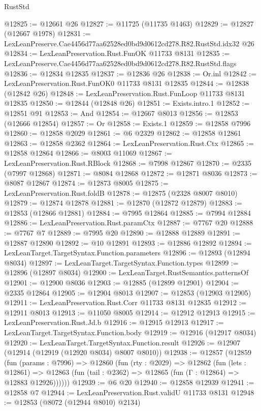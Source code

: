 \begin{lexlean}{RustStd}
\begin{coremodule}
@12825 := @12661 @26
@12827 := @11725 (@11735 @1463)
@12829 := @12827 (@12667 @1978)
@12831 := LexLeanPreserve.Cae4456d77aa62528ed0bd9d0612cd278.R82.RustStd.idx32 @26
@12834 := LexLeanPreservation.Rust.FunOK @11733 @8131
@12835 := LexLeanPreserve.Cae4456d77aa62528ed0bd9d0612cd278.R82.RustStd.flags
@12836 := @12834 @12835
@12837 := @12836 @26
@12838 := Or.inl
@12842 := LexLeanPreservation.Rust.FunOK0 @11733 @8131 @12835
@12844 := @12838 (@12842 @26)
@12848 := LexLeanPreservation.Rust.FunLoop @11733 @8131 @12835
@12850 := @12844 (@12848 @26)
@12851 := Exists.intro.{1}
@12852 := @12851 @91
@12853 := And
@12854 := @12667 @8013
@12856 := @12853 (@12666 @12854)
@12857 := Or
@12858 := Exists.{1}
@12859 := @12858 @7996
@12860 := @12858 @2029
@12861 := @6 @2329
@12862 := @12858 @12861
@12863 := @12858 @2362
@12864 := LexLeanPreservation.Rust.Ctx
@12865 := @12858 @12864
@12866 := @8003 @11069
@12867 := LexLeanPreservation.Rust.RBlock
@12868 := @7998 @12867
@12870 := @2335 (@7997 @12868)
@12871 := @8084 @12868
@12872 := @12871 @8036
@12873 := @8087 @12867
@12874 := @12873 @8005
@12875 := LexLeanPreservation.Rust.foldB
@12878 := @12875 (@2328 @8007 @8010)
@12879 := @12874 @12878
@12881 := @12870 (@12872 @12879)
@12883 := @12853 (@12866 @12881)
@12884 := @7995 @12864
@12885 := @7994 @12884
@12886 := LexLeanPreservation.Rust.paramCtx
@12887 := @7767 @20
@12888 := @7767 @7
@12889 := @7995 @20
@12890 := @12888 @12889
@12891 := @12887 @12890
@12892 := @10 @12891
@12893 := @12886 @12892
@12894 := LexLeanTarget.TargetSyntax.Function.parameters
@12896 := @12893 (@12894 @8034)
@12897 := LexLeanTarget.TargetSyntax.Function.types
@12899 := @12896 (@12897 @8034)
@12900 := LexLeanTarget.RustSemantics.patternsOf
@12901 := @12900 @8036
@12903 := @12885 (@12899 @12901)
@12904 := @2335 @12864
@12905 := @12904 @8013
@12907 := @12853 (@12903 @12905)
@12911 := LexLeanPreservation.Rust.Corr @11733 @8131 @12835
@12912 := @12911 @8013
@12913 := @11050 @8005
@12914 := @12912 @12913
@12915 := LexLeanPreservation.Rust.Jd.b
@12916 := @12915 @12913
@12917 := LexLeanTarget.TargetSyntax.Function.body
@12919 := @12916 (@12917 @8034)
@12920 := LexLeanTarget.TargetSyntax.Function.result
@12926 := @12907 (@12914 (@12919 (@12920 @8034) @8007 @8010))
@12938 := @12857
    (@12859
      (fun (params : @7996) =>
      @12860
        (fun (rty : @2029) =>
        @12862
          (fun (lets : @12861) =>
          @12863 (fun (tail : @2362) => @12865 (fun (Γ : @12864) => @12883 @12926))))))
@12939 := @6 @20
@12940 := @12858 @12939
@12941 := @12858 @7
@12944 := LexLeanPreservation.Rust.validU @11733 @8131
@12948 := @12853 (@8072 (@12944 @8010) @2134)

\end{coremodule}
\end{lexlean}
